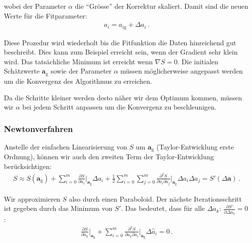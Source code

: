 wobei der Parameter $\alpha$ die ``Gr\"osse'' der Korrektur skaliert. Damit sind die neuen Werte f\"ur die Fitparameter:
\begin{align}
a_i = a_{i\mathrm{g}} + \Delta a_i\,.
\label{eq:vl9-6}
\end{align}

Diese Prozedur wird wiederholt bis die Fitfunktion die Daten hinreichend gut beschreibt. Dies kann zum Beispiel erreicht sein, wenn der Gradient sehr klein wird. Das tats\"achliche Minimum ist erreicht wenn $\nabla S = 0$. Die initialen Sch\"atzwerte $\boldsymbol{a}_\mathrm{g}$ sowie der Parameter $\alpha$ m\"ussen m\"oglicherweise angepasst werden um die Konvergenz des Algorithmus zu erreichen.


\begin{center}
\begin{tcolorbox}[enhanced,width=6in,drop fuzzy shadow southwest,
    colframe=red!50!black,colback=red!05]
   Da die Schritte kleiner werden desto n\"aher wir dem Optimum kommen, m\"ussen wir $\alpha$ bei jedem Schritt anpassen um die Konvergenz zu beschleunigen.
\end{tcolorbox}
\end{center}

\subsubsection{Newtonverfahren}
\label{subsubsec:vl9-2}

Anstelle der einfachen Linearisierung von $S$ um $\boldsymbol{a}_\mathrm{g}$ (Taylor-Entwicklung erste Ordnung), k\"onnen wir auch den zweiten Term der Taylor-Entwicklung ber\"ucksichtigen:
\begin{align}
S \approx S(\boldsymbol{a}_\mathrm{g}) + \sum_{i=0}^m \frac{ \partial S }{ \partial a_i } \bigg|_{\boldsymbol{a}_\mathrm{g}} \Delta a_i + \frac{1}{2} \sum_{i=0}^m \sum_{j=0}^m \frac{ \partial^2 S }{ \partial a_i \partial a_j } \bigg|_{\boldsymbol{a}_\mathrm{g}} \Delta a_i \Delta a_j = S'(\Delta \boldsymbol{a}) \,.
\label{eq:vl9-7}
\end{align}

Wir approximieren $S$ also durch einen Paraboloid. Der n\"achste Iterationsschritt ist gegeben durch das Minimum von $S'$. Das bedeutet, dass f\"ur alle $\Delta a_k \text{: } \frac{ \partial S' }{ \partial \Delta a_k} = 0$:
\begin{align}
\frac{ \partial S }{ \partial a_k } \bigg|_{\boldsymbol{a}_\mathrm{g}} + \sum_{i=0}^m \frac{ \partial^2 S }{ \partial a_k \partial a_i } \bigg|_{\boldsymbol{a}_\mathrm{g}} \Delta \hat{a}_i = 0 \,.
\label{eq:vl9-8}
\end{align}

